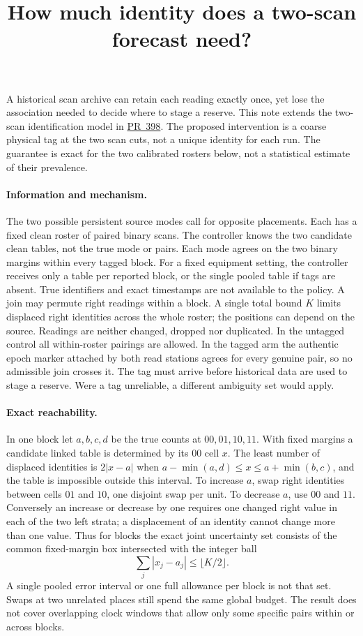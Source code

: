 \documentclass{article}
\title{How much identity does a two-scan forecast need?}
\date{}
\begin{document}
\maketitle
A historical scan archive can retain each reading exactly once, yet
lose the association needed to decide where to stage a reserve.
This note extends the two-scan identification model in
\href{https://github.com/eternal-november/eos-research-programmes/pull/398}{PR~398}.
The proposed intervention is a coarse physical tag at the two scan cuts,
not a unique identity for each run. The guarantee is exact for the two
calibrated rosters below, not a statistical estimate of their prevalence.

\paragraph{Information and mechanism.}
The two possible persistent source modes call for opposite placements.
Each has a fixed clean roster of paired binary scans. The controller
knows the two candidate clean tables, not the true mode or pairs. Each
mode agrees on the two binary margins within every tagged block. For a
fixed equipment setting, the controller receives only a table per
reported block, or the single pooled table if tags are absent. True
identifiers and exact timestamps are not available to the policy.
A join may permute right readings within a block. A single total bound
$K$ limits displaced right identities across the whole roster; the
positions can depend on the source. Readings are neither changed, dropped
nor duplicated. In the untagged control all within-roster pairings are
allowed. In the tagged arm the authentic epoch marker attached by both
read stations agrees for every genuine pair, so no admissible join
crosses it. The tag must arrive before historical data are used to stage
a reserve. Were a tag unreliable, a different ambiguity set would apply.

\paragraph{Exact reachability.}
In one block let $a,b,c,d$ be the true counts at $00,01,10,11$. With
fixed margins a candidate linked table is determined by its $00$ cell
$x$. The least number of displaced identities is $2|x-a|$ when
$a-\min(a,d)\le x\le a+\min(b,c)$, and the table is impossible outside
this interval. To increase $a$, swap right identities between cells
$01$ and $10$, one disjoint swap per unit. To decrease $a$, use $00$
and $11$. Conversely an increase or decrease by one requires one
changed right value in each of the two left strata; a displacement
of an identity cannot change more than one value. Thus for blocks
the exact joint uncertainty set consists of the common fixed-margin
box intersected with the integer ball
\[
      \sum_j |x_j-a_j|\le \lfloor K/2\rfloor .
\]
A single pooled error interval or one full allowance per block is not
that set. Swaps at two unrelated places still spend the same global
budget. The result does not cover overlapping clock windows that
allow only some specific pairs within or across blocks.
\end{document}
